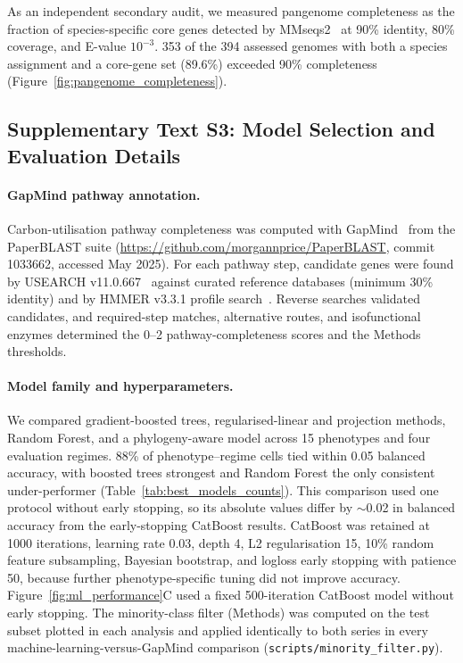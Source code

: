As an independent secondary audit, we measured pangenome completeness as the fraction of species-specific core genes detected by MMseqs2~\cite{Steinegger2017MMseqs2} at 90\% identity, 80\% coverage, and E-value $10^{-3}$.
353 of the 394 assessed genomes with both a species assignment and a core-gene set (89.6\%) exceeded 90\% completeness (Figure~\ref{fig:pangenome_completeness}).

\subsection*{Supplementary Text S3: Model Selection and Evaluation Details}

\paragraph*{GapMind pathway annotation.}
Carbon-utilisation pathway completeness was computed with GapMind~\cite{Price2022GapMindCarbon,Price2020GapMind} from the PaperBLAST suite (\url{https://github.com/morgannprice/PaperBLAST}, commit 1033662, accessed May 2025).
For each pathway step, candidate genes were found by USEARCH v11.0.667~\cite{Edgar2010} against curated reference databases (minimum 30\% identity) and by HMMER v3.3.1 profile search~\cite{Eddy2011}.
Reverse searches validated candidates, and required-step matches, alternative routes, and isofunctional enzymes determined the 0--2 pathway-completeness scores and the Methods thresholds.

\paragraph*{Model family and hyperparameters.}
We compared gradient-boosted trees, regularised-linear and projection methods, Random Forest, and a phylogeny-aware model across 15 phenotypes and four evaluation regimes.
88\% of phenotype--regime cells tied within 0.05 balanced accuracy, with boosted trees strongest and Random Forest the only consistent under-performer (Table~\ref{tab:best_models_counts}).
This comparison used one protocol without early stopping, so its absolute values differ by $\sim$0.02 in balanced accuracy from the early-stopping CatBoost results.
CatBoost was retained at 1000 iterations, learning rate 0.03, depth 4, L2 regularisation 15, 10\% random feature subsampling, Bayesian bootstrap, and logloss early stopping with patience 50, because further phenotype-specific tuning did not improve accuracy.
Figure~\ref{fig:ml_performance}C used a fixed 500-iteration CatBoost model without early stopping.
The minority-class filter (Methods) was computed on the test subset plotted in each analysis and applied identically to both series in every machine-learning-versus-GapMind comparison (\texttt{scripts/minority\_filter.py}).

